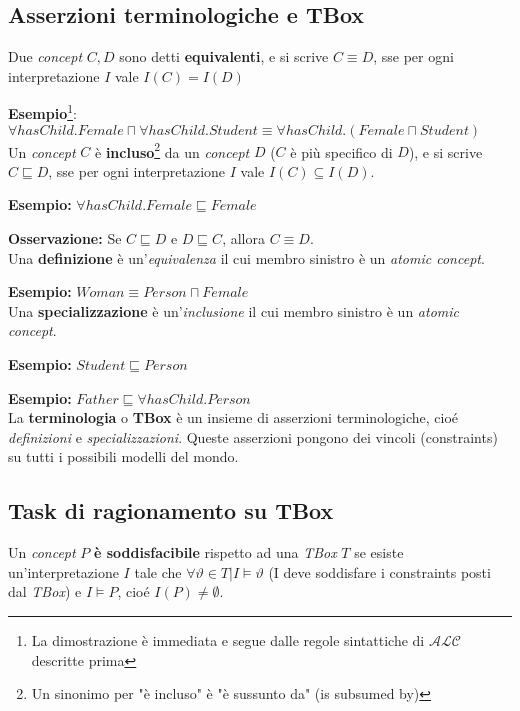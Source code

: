 \subsection{Asserzioni terminologiche e TBox}
Due \textit{concept} $C, D$ sono detti \textbf{equivalenti}, e si scrive $C \equiv D$, sse per ogni interpretazione $I$ vale $I(C) = I(D)$

\textbf{Esempio}\footnote{La dimostrazione è immediata e segue dalle regole sintattiche di $\mathscr{ALC}$ descritte prima}: $\forall hasChild. Female \sqcap \forall hasChild. Student \equiv \forall hasChild . (Female \sqcap Student)$
\\

Un \textit{concept} $C$ è \textbf{incluso}\footnote{Un sinonimo per "è incluso" è "è sussunto da" (is subsumed by)} da un \textit{concept} $D$ ($C$ è più specifico di $D$), e si scrive $C \sqsubseteq D$, sse per ogni interpretazione $I$ vale $I(C) \subseteq I(D)$.

\textbf{Esempio:} $\forall hasChild. Female \sqsubseteq Female$ 

\textbf{Osservazione:} Se $C \sqsubseteq D$ e $D \sqsubseteq C$, allora $C \equiv D$.
\\

Una \textbf{definizione} è un'\textit{equivalenza} il cui membro sinistro è un \textit{atomic concept}.

\textbf{Esempio:} $Woman \equiv Person \sqcap Female$
\\

Una \textbf{specializzazione} è un'\textit{inclusione} il cui membro sinistro è un \textit{atomic concept}.

\textbf{Esempio:} $Student \sqsubseteq Person$

\textbf{Esempio:} $Father \sqsubseteq \forall hasChild. Person$
\\

La \textbf{terminologia} o \textbf{TBox} è un insieme di asserzioni terminologiche, cioé \textit{definizioni} e \textit{specializzazioni}. Queste asserzioni pongono dei vincoli (constraints) su tutti i possibili modelli del mondo.

\subsection{Task di ragionamento su TBox}

Un \textit{concept} $P$ \textbf{è soddisfacibile} rispetto ad una \textit{TBox} $T$ se esiste un'interpretazione $I$ tale che $\forall \vartheta \in T | I \models \vartheta$ (I deve soddisfare i constraints posti dal \textit{TBox}) e $I \models P$, cioé $I(P) \neq \emptyset$.

